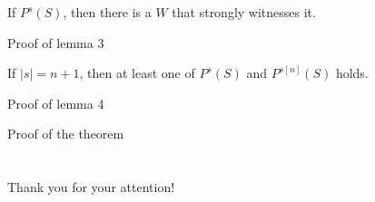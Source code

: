 \documentclass{beamer} %
\begin{document}
\begin{frame} 
    \begin{lemma}[3]
        If $P^s(S)$, then there is a $W$ that strongly witnesses it.\label{enpowerment}
    \end{lemma}
\end{frame}


\begin{frame}{Proof of lemma 3}
    
\end{frame}


\begin{frame}
    \begin{lemma}[4]
        If $|s| = n+1$, then at least one of $P^s(S)$ and $P^{s[n]}(S)$ holds.\label{binary}
    \end{lemma}
\end{frame}


\begin{frame}{Proof of lemma 4}
    
\end{frame}


\begin{frame}{Proof of the theorem}
    
\end{frame}

\section*{}
\begin{frame}
    \huge{Thank you for your attention!}
\end{frame}
\end{document}
